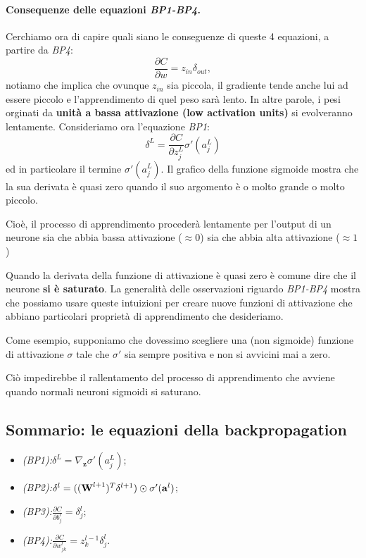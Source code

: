 \paragraph{Consequenze delle equazioni \textit{BP1-BP4}.} Cerchiamo ora di capire quali siano le conseguenze di queste 4 equazioni, a partire da \textit{BP4}:
\begin{equation}
    \frac{\partial C}{\partial w}=z_{in}\delta_{out},
\end{equation}
notiamo che implica che ovunque $z_{in}$ sia piccola, il gradiente tende anche lui ad essere piccolo e l'apprendimento di quel peso sarà lento. In altre parole, i pesi orginati da \textbf{unità a bassa attivazione (low activation units)} si evolveranno lentamente. 
\newline
\newline
Consideriamo ora l'equazione \textit{BP1}:
\begin{equation}
    \delta^L=\frac{\partial C}{\partial z^L_j}\sigma'(a^L_j)
\end{equation}
ed in particolare il termine $\sigma'(a^L_j)$. Il grafico della funzione sigmoide mostra che la sua derivata è quasi zero quando il suo argomento è o molto grande o molto piccolo.


Cioè, il processo di apprendimento procederà lentamente per l'output di un neurone sia che abbia bassa attivazione ($\approx 0$) sia che abbia alta attivazione ($\approx 1$)


Quando la derivata della funzione di attivazione è quasi zero è comune dire che il neurone \textbf{si è saturato}.
\newline
\newline
La generalità delle osservazioni riguardo \textit{BP1-BP4} mostra che possiamo usare queste intuizioni per creare nuove funzioni di attivazione che abbiano particolari proprietà di apprendimento che desideriamo.


Come esempio, supponiamo che dovessimo scegliere una (non sigmoide) funzione di attivazione $\sigma$ tale che $\sigma'$ sia sempre positiva e non si avvicini mai a zero.


Ciò impedirebbe il rallentamento del processo di apprendimento che avviene quando normali neuroni sigmoidi si saturano.
\newpage
\subsection{Sommario: le equazioni della backpropagation}
\begin{itemize}
    \item \textit{(BP1):}$\delta^L=\nabla_\textbf{z}\sigma'(a^L_j)$;
    \item \textit{(BP2):}$\delta^l=((\text{\textbf{W}}^{l+1})^T\delta^{l+1})\odot\sigma'(\text{\textbf{a}}^l)$;
    \item \textit{(BP3):}$\frac{\partial C}{\partial b_j^l} = \delta_j^l$;
    \item \textit{(BP4):}$\frac{\partial C}{\partial w_{jk}^l} = z^{l-1}_k\delta^l_j$.
\end{itemize}
\newpage
